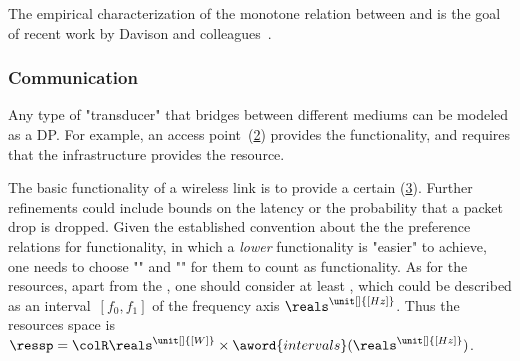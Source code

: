 \begin{figure}[h]
    \centering
    \caption{\label{fig:progressive}}
\end{figure}


\begin{example}
    The empirical characterization of the monotone relation between  and 
    is the goal of recent work by Davison and colleagues~\cite{nardi15introducing,zia16comparative}.
\end{example}

\subsubsection{Communication}

\begin{example}[Transducers]
    Any type of "transducer" that bridges between different
    mediums can be modeled as a DP. For example, an access point~(\cref{fig:accesspoint})
    provides the  functionality, and requires
    that the infrastructure provides the  resource.
\end{example}

\begin{figure}[h]
    \centering
    \caption{\label{fig:accesspoint}}
\end{figure}

\begin{example}
    The basic functionality of a wireless link is to provide
    a certain  (\cref{fig:networklink}). Further refinements could include bounds
    on the latency or the probability that a packet drop is dropped. Given
    the established convention about the the preference relations for
    functionality, in which a \emph{lower} functionality is "easier"
    to achieve, one needs to choose ""
    and "" for them
    to count as functionality. As for the resources, apart from the , one should consider at least ,
    which could be described as an interval~$[f_0,f_1]$ of the frequency
    axis $\reals^{\unit[]{[Hz]}}$. Thus the resources space is $\ressp=\colR\reals^{\unit[]{[W]}}\times\aword{intervals}(\reals^{\unit[]{[Hz]}})$.
\end{example}
\begin{figure}[h]
    \begin{center}
    \end{center}
    \caption{ \label{fig:networklink}}
\end{figure}

